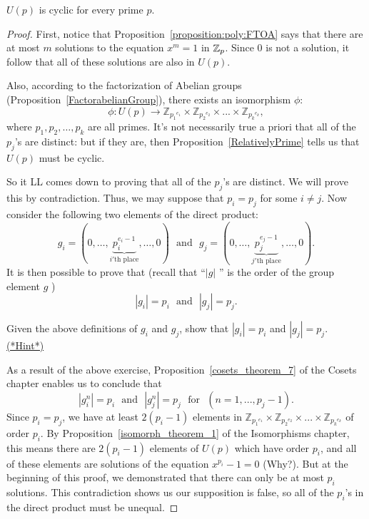 \begin {prop}{}
$U(p)$ is cyclic for every prime $p$.
\end {prop}
\begin {proof}
First, notice that Proposition~\ref{proposition:poly:FTOA} says that there are at most $m$ solutions to the equation $x^m = 1$ in $\mathbb{Z}_p$. Since 0 is not a solution, it follow that all of these solutions are also in $U(p)$.

Also, according to the factorization of Abelian groups (Proposition~\ref{FactorabelianGroup}), there exists an isomorphism $\phi$:
\[\phi: U(p)  \rightarrow {\mathbb{Z}_{{p_1}^{e_1}}}  \times   {\mathbb{Z}_{{p_2}^{e_2}}}  \times  ... \times   {\mathbb{Z}_{{p_k}^{e_k}}},\]
where $p_1, p_2, \ldots, p_k$ are all primes.  It's not necessarily true a priori  that all of the $p_j$'s are distinct: but if they are, then Proposition~\ref{RelativelyPrime} tells us that $U(p)$ must be cyclic. 

So it LL comes down to proving that all of the $p_j$'s are distinct. We will prove this by contradiction. Thus, we may suppose that $p_i = p_j$ for some $i \neq j$. 
Now consider the following two elements of the direct product:
\[
g_i = ( 0, \ldots ,\underbrace{p_i^{e_i-1}}_{i'\text{th place}},\ldots,0) \text{~~and~~} g_j = ( 0, \ldots ,\underbrace{p_j^{e_j-1}}_{j'\text{th place}},\ldots,0).
\]
It is then possible to prove that (recall that ``$|g|$ '' is the order of the group element $g$ )
\[ |g_i| = p_i \text{~~and~~}  |g_j| = p_j. \]

\begin{exercise}\label{exercise:poly:orders}
Given the above definitions of $g_i$ and $g_j$, show that   $|g_i| = p_i$ and  $|g_j| = p_j$.
\hyperref[sec:polyrings:hints]{(*Hint*)} 
\end{exercise}
As a result of the above exercise, Proposition~\ref{cosets_theorem_7} of the Cosets chapter  enables us to conclude that 
\[
|g_i^n| = p_i \text{~~and~~} |g_j^n| = p_j \text{~ for~~} (n = 1,...,p_j-1).
\]
Since $p_i = p_j$, we have at least $2(p_i-1)$ elements in ${\mathbb{Z}_{{p_1}^{e_1}}}  \times   {\mathbb{Z}_{{p_2}^{e_2}}}  \times  ... \times   {\mathbb{Z}_{{p_k}^{e_k}}}$ of order $p_i$. By 
Proposition~\ref{isomorph_theorem_1} of the Isomorphisms chapter, this means there are  $2(p_i-1)$ elements of $U(p)$ which have order $p_i$, and all of these elements are solutions of the equation $x^{p_i}-1=0$ (Why?). 
But at the beginning of this proof, we demonstrated that there can only be at most $p_i$ solutions. This contradiction shows us our supposition is false, so all of the $p_i$'s in the direct product must be unequal.
\end{proof}

